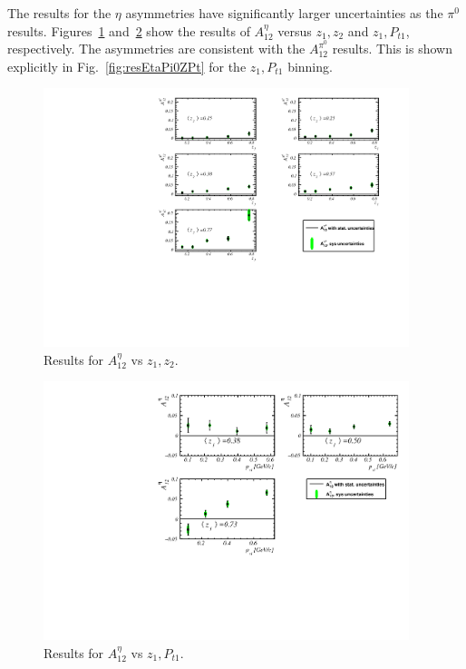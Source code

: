 \documentclass[aps,prX,preprint,groupedaddress,linenumbers]{revtex4-1}
\begin{document}
The results for the $\eta$ asymmetries have significantly larger uncertainties as the $\pi^0$ results. Figures~\ref{fig:resEtaZ1Z2} and~\ref{fig:resEtaZPt} show the results of $A^{\eta}_{12}$ versus $z_1,z_2$ and $z_1,P_{t1}$, respectively. The asymmetries are consistent with the $A^{\pi^0}_{12}$ results. This is shown explicitly in Fig.~\ref{fig:resEtaPi0ZPt} for the $z_1,P_{t1}$ binning.
\begin{figure}
\includegraphics[width=0.95\textwidth]{figs_paper/pi0VsZ1Z2.pdf}
\caption{Results for $A^{\eta}_{12}$ vs $z_1, z_2$.\label{fig:resEtaZ1Z2}}
\end{figure}

\begin{figure}
\includegraphics[width=0.95\textwidth]{figs_paper/etaVsZPt.pdf}
\caption{Results for $A^{\eta}_{12}$ vs $z_1, P_{t1}$.\label{fig:resEtaZPt}}
\end{figure}
\end{document}
